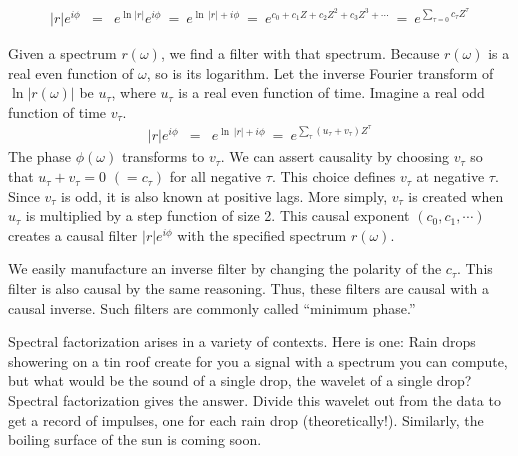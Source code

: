 \par
\begin{eqnarray}
|r|e^{i\phi} &=&
e^{\ln|r|}e^{i\phi} \ =\
e^{\ln\,|r| + i\phi} \ =\  
e^{c_0+c_1Z+c_2Z^2+c_3Z^3+\cdots} \ =\ 
e^{\sum_{\tau=0} c_\tau Z^\tau}
\end{eqnarray}
\par\noindent
Given a spectrum $r(\omega)$, we find a filter with that spectrum.
Because $r(\omega)$ is a real even function of $\omega$, so is its logarithm.
Let the inverse Fourier transform of $\ln |r(\omega)|$ be $u_\tau$,
where $u_\tau$ is a real even function of time.
Imagine a real odd function of time $v_\tau$.
\begin{eqnarray}
|r|e^{i\phi} &=& e^{\ln\,|r| + i\phi} \ =\  e^{\sum_\tau (u_\tau+v_\tau) Z^\tau}
\end{eqnarray}
The phase $\phi(\omega)$ transforms to $v_\tau$.
We can assert causality
by choosing $v_\tau$ so that $u_\tau+v_\tau=0$ $ (=c_\tau)$ for all negative $\tau$.
This choice defines $v_\tau$ at negative $\tau$.
Since $v_\tau$ is odd, it is also known at positive lags.
More simply,
$v_\tau$ is created when $u_\tau$ is multiplied by a step function of size 2.  
This causal exponent
$(c_0,c_1,\cdots)$
creates a causal filter $|r|e^{i\phi}$
with the specified spectrum $r(\omega)$.

\par
We easily manufacture an inverse filter by changing the polarity of the $c_\tau$.
This filter is also causal by the same reasoning.
Thus, these filters are causal with a causal inverse.
Such filters are commonly called ``minimum phase.''

\par
Spectral factorization arises in a variety of contexts. Here is one:
Rain drops showering on a tin roof create for you a signal
with a spectrum you can compute,
but what would be the sound of a single drop,
the wavelet of a single drop?
Spectral factorization gives the answer.
Divide this wavelet out from the data
to get a record of impulses, one for each rain drop (theoretically!).
Similarly, the boiling surface of the sun is coming soon.

